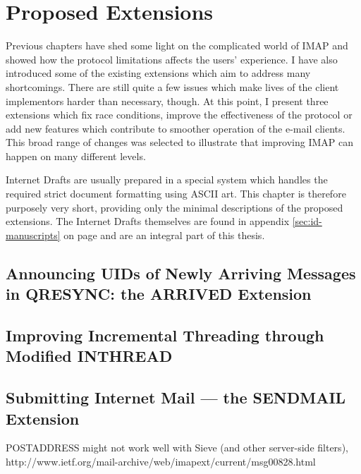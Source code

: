 \documentclass[trojita]{subfiles}
\begin{document}
\chapter{Proposed Extensions}

Previous chapters have shed some light on the complicated world of IMAP and showed how the protocol limitations affects
the users' experience.  I have also introduced some of the existing extensions which aim to address many shortcomings.
There are still quite a few issues which make lives of the client implementors harder than necessary, though.  At this
point, I present three extensions which fix race conditions, improve the effectiveness of the protocol or add new
features which contribute to smoother operation of the e-mail clients.  This broad range of changes was selected to
illustrate that improving IMAP can happen on many different levels.

Internet Drafts are usually prepared in a special system \cite{rfc-formatting} which handles the required strict
document formatting using ASCII art.  This chapter is therefore purposely very short, providing only the minimal
descriptions of the proposed extensions.  The Internet Drafts themselves are found in appendix \ref{sec:id-manuscripts}
on page \pageref{sec:id-manuscripts} and are an integral part of this thesis.

\section{Announcing UIDs of Newly Arriving Messages in QRESYNC: the ARRIVED Extension}
\label{sec:draft-arrived}

\section{Improving Incremental Threading through Modified INTHREAD}
\label{sec:draft-inthread-ext}

\section{Submitting Internet Mail --- the SENDMAIL Extension}
\label{sec:draft-sendmail}

POSTADDRESS might not work well with Sieve (and other server-side filters),
http://www.ietf.org/mail-archive/web/imapext/current/msg00828.html
\end{document}
